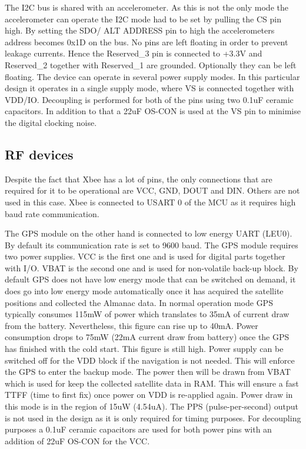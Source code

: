 The I2C bus is shared with an accelerometer. As this is not the only mode the accelerometer can operate the I2C mode had to be set by pulling the CS pin high. By setting the SDO/ ALT ADDRESS pin to high the accelerometers address becomes 0x1D on the bus. No pins are left floating in order to prevent leakage currents. Hence the Reserved\_3 pin is connected to +3.3V and Reserved\_2 together with Reserved\_1 are grounded. Optionally they can be left floating. 
The device can operate in several power supply modes. In this particular design it operates in a single supply mode, where VS is connected together with VDD/IO. Decoupling is performed for both of the pins using two 0.1uF ceramic capacitors. In addition to that a 22uF OS-CON is used at the VS pin to minimise the digital clocking noise.

\subsection{RF devices}
Despite the fact that Xbee has a lot of pins, the only connections that are required for it to be operational are VCC, GND, DOUT and DIN. Others are not used in this case. Xbee is connected to USART 0 of the MCU as it requires high baud rate communication.

The GPS module on the other hand is connected to low energy UART (LEU0). By default its communication rate is set to 9600 baud. The GPS module requires two power supplies. VCC is the first one and is used for digital parts together with I/O. VBAT is the second one and is used for non-volatile back-up block. By default GPS does not have low energy mode that can be switched on demand, it does go into low energy mode automatically once it has acquired the satellite positions and collected the Almanac data. In normal operation mode GPS typically consumes 115mW of power which translates to 35mA of current draw from the battery. Nevertheless, this figure can rise up to 40mA. Power consumption drops to 75mW (22mA current draw from battery) once the GPS has finished with the cold start. This figure is still high. Power supply can be switched off for the VDD block if the navigation is not needed. This will enforce the GPS to enter the backup mode. The power then will be drawn from VBAT which is used for keep the collected satellite data in RAM. This will ensure a fast TTFF (time to first fix) once power on VDD is re-applied again. Power draw in this mode is in the region of 15uW (4.54uA).
The PPS (pulse-per-second) output is not used in the design as it is only required for timing purposes. For decoupling purposes a 0.1uF ceramic capacitors are used for both power pins with an addition of 22uF OS-CON for the VCC.


